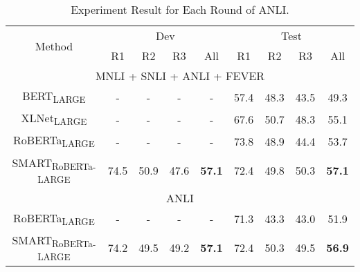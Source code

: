\begin{table*}[htb!]
    \centering
    \begin{tabular}{c|c|c|c|c|c|c|c|c}
    \hline
         \multirow{2}{*}{Method} & \multicolumn{4}{c|}{Dev} & \multicolumn{4}{c}{Test}  \\
         \cline{2-9}
          &  R1 & R2 & R3 & All & R1 & R2 & R3 & All  \\
          \hline 
 		\multicolumn{9}{c}{ MNLI + SNLI + ANLI + FEVER  }  \\ \hline
          BERT\textsubscript{LARGE}  \citep{nie2019adversarial}  &-&-&-& - &57.4&48.3&43.5& 49.3 \\
		\hline
		XLNet\textsubscript{LARGE} \citep{nie2019adversarial}  &-&-&-& -  &67.6&50.7&48.3& 55.1\\
		\hline
		RoBERTa\textsubscript{LARGE} \citep{nie2019adversarial}  &-&-&-& - &73.8&48.9&44.4& 53.7\\
		\hline 
		SMART\textsubscript{RoBERTa-LARGE}  & 74.5&50.9&47.6& \textbf{57.1} &72.4&49.8&50.3& \textbf{57.1} \\ \hline \hline
 		\multicolumn{9}{c}{ ANLI }  \\ 
 		\hline
 		RoBERTa\textsubscript{LARGE} \citep{nie2019adversarial} &-&-&-& -  & 71.3&43.3&43.0& 51.9 \\ 		\hline 
SMART\textsubscript{RoBERTa-LARGE}  &74.2&49.5&49.2& \textbf{57.1} &72.4&50.3&49.5& \textbf{56.9}\\
\hline
    \end{tabular}
    \caption{Experiment Result for Each Round of ANLI.}
    \label{tab:anli_full}
\end{table*}
